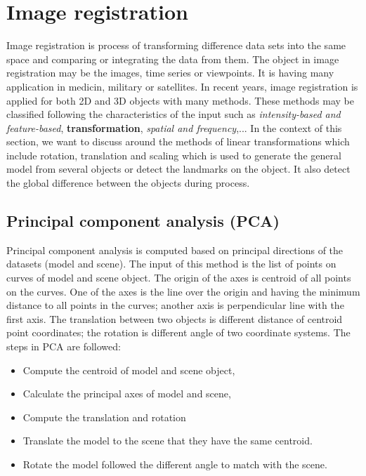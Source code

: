 \section{Image registration}
Image registration is process of transforming difference data sets into the same space and comparing or integrating the data from them. The object in image registration may be the images, time series or viewpoints. It is having many application in medicin, military or satellites. In recent years, image registration is applied for both 2D and 3D objects with many methods. These methods may be classified following the characteristics of the input such as \textit{intensity-based and feature-based}, \textbf{transformation}, \textit{spatial and frequency},... In the context of this section, we want to discuss around the methods of linear transformations which include rotation, translation and scaling which is used to generate the general model from several objects or detect the landmarks on the object. It also detect the global difference between the objects during process.
\subsection{Principal component analysis (PCA)}
Principal component analysis is computed based on principal directions of the datasets (model and scene). The input of this method is the list of points on curves of model and scene object. The origin of the axes is centroid of all points on the curves. One of the axes is the line over the origin and having the minimum distance to all points in the curves; another axis is perpendicular line with the first axis. The translation between two objects is different distance of centroid point coordinates; the rotation is different angle of two coordinate systems. The steps in PCA are followed:
\begin{itemize}
	\item Compute the centroid of model and scene object,
	\item Calculate the principal axes of model and scene,
	\item Compute the translation and rotation
	\item Translate the model to the scene that they have the same centroid.
	\item Rotate the model followed the different angle to match with the scene.
\end{itemize}
